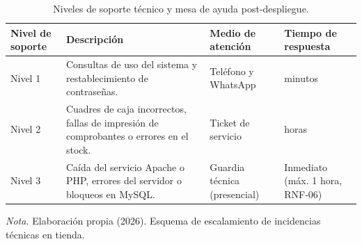 \begin{table}[H]
  \centering
  \small
  \caption{Niveles de soporte técnico y mesa de ayuda post-despliegue.}
  \label{tab:despliegue_soporte}
  \begin{tabularx}{\linewidth}{|>{\centering\arraybackslash}p{1.7cm}|>{\raggedright\arraybackslash}X|>{\raggedright\arraybackslash}p{2.7cm}|>{\raggedright\arraybackslash}p{2.5cm}|}
    \hline
    \textbf{Nivel de soporte} & \textbf{Descripción} & \textbf{Medio de atención} & \textbf{Tiempo de respuesta} \\ \hline
    Nivel 1 & Consultas de uso del sistema y restablecimiento de contraseñas. & Teléfono y WhatsApp & 30 minutos \\ \hline
    Nivel 2 & Cuadres de caja incorrectos, fallas de impresión de comprobantes o errores en el stock. & Ticket de servicio & 4 horas \\ \hline
    Nivel 3 & Caída del servicio Apache o PHP, errores del servidor o bloqueos en MySQL. & Guardia técnica (presencial) & Inmediato (máx. 1 hora, RNF-06) \\ \hline
  \end{tabularx}
  \par\vspace{0.2cm}
  {\raggedright \small \emph{Nota.} Elaboración propia (2026). Esquema de escalamiento de incidencias técnicas en tienda.\par}
\end{table}
